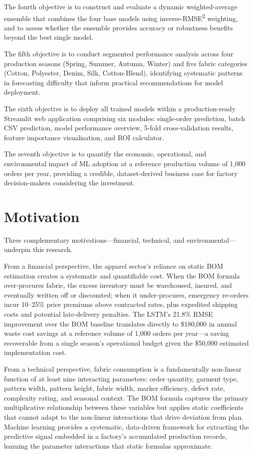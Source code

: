 The fourth objective is to construct and evaluate a dynamic weighted-average ensemble that combines the four base models using inverse-RMSE\textsuperscript{2} weighting, and to assess whether the ensemble provides accuracy or robustness benefits beyond the best single model.

The fifth objective is to conduct segmented performance analysis across four production seasons (Spring, Summer, Autumn, Winter) and five fabric categories (Cotton, Polyester, Denim, Silk, Cotton-Blend), identifying systematic patterns in forecasting difficulty that inform practical recommendations for model deployment.

The sixth objective is to deploy all trained models within a production-ready Streamlit web application comprising six modules: single-order prediction, batch CSV prediction, model performance overview, 5-fold cross-validation results, feature importance visualisation, and ROI calculator.

The seventh objective is to quantify the economic, operational, and environmental impact of ML adoption at a reference production volume of 1{,}000 orders per year, providing a credible, dataset-derived business case for factory decision-makers considering the investment.

\secdiv
\section{Motivation}
Three complementary motivations---financial, technical, and environmental---underpin this research.

From a financial perspective, the apparel sector's reliance on static BOM estimation creates a systematic and quantifiable cost. When the BOM formula over-procures fabric, the excess inventory must be warehoused, insured, and eventually written off or discounted; when it under-procures, emergency re-orders incur 10--25\% price premiums above contracted rates, plus expedited shipping costs and potential late-delivery penalties. The LSTM's 21.8\% RMSE improvement over the BOM baseline translates directly to \$180{,}000 in annual waste cost savings at a reference volume of 1{,}000 orders per year---a saving recoverable from a single season's operational budget given the \$50{,}000 estimated implementation cost.

From a technical perspective, fabric consumption is a fundamentally non-linear function of at least nine interacting parameters: order quantity, garment type, pattern width, pattern height, fabric width, marker efficiency, defect rate, complexity rating, and seasonal context. The BOM formula captures the primary multiplicative relationship between these variables but applies static coefficients that cannot adapt to the non-linear interactions that drive deviation from plan. Machine learning provides a systematic, data-driven framework for extracting the predictive signal embedded in a factory's accumulated production records, learning the parameter interactions that static formulas approximate.

